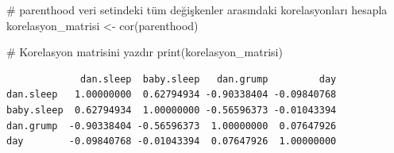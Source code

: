 \documentclass[
  letterpaper,
  DIV=11,
  numbers=noendperiod]{scrartcl}
\newenvironment{Shaded}{\begin{snugshade}}{\end{snugshade}}
\newcommand{\CommentTok}[1]{\textcolor[rgb]{0.37,0.37,0.37}{#1}}
\newcommand{\FunctionTok}[1]{\textcolor[rgb]{0.28,0.35,0.67}{#1}}
\newcommand{\NormalTok}[1]{\textcolor[rgb]{0.00,0.23,0.31}{#1}}
\newcommand{\OtherTok}[1]{\textcolor[rgb]{0.00,0.23,0.31}{#1}}
\begin{document}
\begin{Shaded}
\begin{Highlighting}[]
\CommentTok{\# parenthood veri setindeki tüm değişkenler arasındaki korelasyonları hesapla}
\NormalTok{korelasyon\_matrisi }\OtherTok{\textless{}{-}} \FunctionTok{cor}\NormalTok{(parenthood)}

\CommentTok{\# Korelasyon matrisini yazdır}
\FunctionTok{print}\NormalTok{(korelasyon\_matrisi)}
\end{Highlighting}
\end{Shaded}

\begin{verbatim}
             dan.sleep  baby.sleep   dan.grump         day
dan.sleep   1.00000000  0.62794934 -0.90338404 -0.09840768
baby.sleep  0.62794934  1.00000000 -0.56596373 -0.01043394
dan.grump  -0.90338404 -0.56596373  1.00000000  0.07647926
day        -0.09840768 -0.01043394  0.07647926  1.00000000
\end{verbatim}
\end{document}
